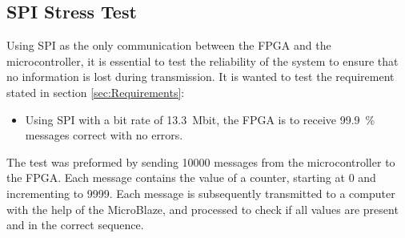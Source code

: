 \documentclass[../../main.tex]{subfiles}
\begin{document}


\subsection{SPI Stress Test}
Using SPI as the only communication between the FPGA and the microcontroller, it is essential to test the reliability of the system to ensure that no information is lost during transmission. It is wanted to test the requirement stated in section \ref{sec:Requirements}:
\begin{itemize}
    \item Using SPI with a bit rate of \SI{13,3}{\mega bit}, the FPGA is to receive \SI{99,9}{\percent} messages correct with no errors.
\end{itemize}
The test was preformed by sending 10000 messages from the microcontroller to the FPGA. Each message contains the value of a counter, starting at 0 and incrementing to 9999. Each message is subsequently transmitted to a computer with the help of the MicroBlaze, and processed to check if all values are present and in the correct sequence.  
\end{document}
